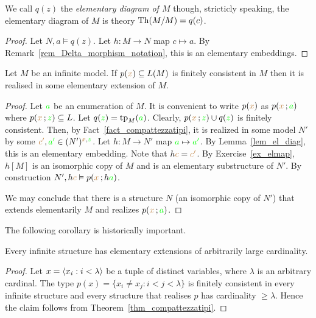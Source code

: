  We call $q(z)$ the \emph{elementary diagram of $M$} though, stricticly speaking, the elementary diagram of $M$ is theory ${\rm Th}(M/M)=q(c)$.

\vspace*{-\parskip}
\begin{proof}
    Let $N,a\models q(z)$.
    Let $h:M\to N$ map $c\mapsto a$.
    By Remark~\ref{rem_Delta_morphism_notation}, this is an elementary embeddings.
\end{proof}

\begin{void}\label{thm_compattezzatipi}
    Let $M$ be an infinite model.
    If $p({\color{brown} x})\subseteq L(M)$ is finitely consistent in $M$ then it is realised in some elementary extension of $M$.
\end{void}

\begin{proof}
  Let ${\color{green} a}$ be an enumeration of $M$.
  It is convenient to write $p({\color{brown} x})$ as $p({\color{brown} x}\,;{\color{green} a})$ where $p({\color{brown} x}\,;{\color{green} z})\subseteq L$.
  Let $q({\color{green} z})={\rm tp}_M({\color{green} a})$.
  Clearly, $p({\color{brown} x}\,;{\color{green} z})\cup q({\color{green} z})$ is finitely consistent.
  Then, by Fact~\ref{fact_compattezzatipi}, it is realized in some model $N'$ by some ${\color{brown} c'},{\color{green} a'}\in (N')^{{\color{brown} x},{\color{green} z}}$.                                                      
  Let $h:M\to N'$ map ${\color{green} a}\mapsto {\color{green}a'}$.
  By Lemma~\ref{lem_el_diag}, this is an elementary embedding.
  Note that $h{\color{brown} c}={\color{brown} c'}$.
  By Exercise~\ref{ex_elmap}, $h[M]$ is an isomorphic copy of $M$ and is an elementary substructure of $N'$.
  By construction $N',h{\color{brown} c}\vDash p({\color{brown} x}\,;h{\color{green} a})$.

  We may conclude that there is a structure $N$ (an isomorphic copy of $N'$) that extends elementarily $M$ and realizes $p({\color{brown} x}\,;{\color{green} a})$.
\end{proof}

The following corollary is historically important.

\begin{void}
Every infinite structure has elementary extensions of arbitrarily large cardinality.
\end{void}

\begin{proof}
Let $x=\langle x_i:i<\lambda\rangle$ be a tuple of distinct variables, where $\lambda$ is an arbitrary cardinal.
The type $p(x)=\big\{x_i\neq x_j: i<j<\lambda\big\}$ is finitely consistent in every infinite structure and every structure that realises $p$ has cardinality $\ge\lambda$.
Hence the claim follows from Theorem~\ref{thm_compattezzatipi}.
\end{proof}

